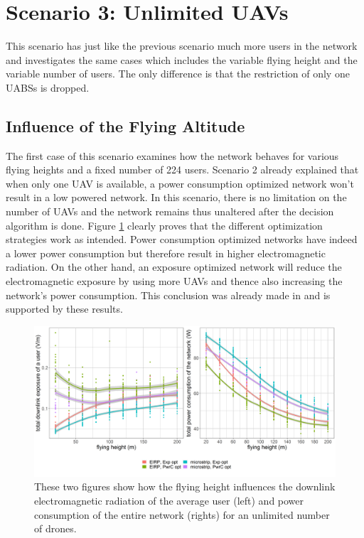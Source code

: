 \section{Scenario 3: Unlimited \gls{UAV}s}
\label{s3}

This scenario has just like the previous scenario much more users in the network 
and investigates the same cases which includes the variable flying height and the variable number of  users.
The only difference is that the restriction of only one \gls{UABS}s is dropped.

\subsection{Influence of the Flying Altitude}
\label{S3A}

The first case of this scenario examines how the network behaves for various flying heights and a fixed number of 224 users.
Scenario 2 already explained that when only one \gls{UAV} is available, a power consumption optimized network won’t result in a low 
powered network. In this scenario, there is no limitation on the number of \gls{UAV}s and the network remains thus unaltered after the decision 
algorithm is done. Figure \ref{fig:s3a_dlAndPc} clearly proves that the different optimization strategies work as intended.
Power consumption optimized networks have indeed a lower power consumption but therefore result in higher electromagnetic radiation.
On the other hand, an exposure optimized network will reduce the electromagnetic exposure by using more \gls{UAV}s and thence also increasing the network's power consumption.
This conclusion was already made  in \cite{J1} and is supported by these results.

\begin{figure}[h!]
  \includegraphics[width=\textwidth]{../results/s3/fhvsdlAndPc.png}
  \caption{
    These two figures show how the flying height influences the downlink electromagnetic radiation of the average user (left) and 
  power consumption of the entire network (rights) for an unlimited number of drones.
  }
     \label{fig:s3a_dlAndPc}
\end{figure}

